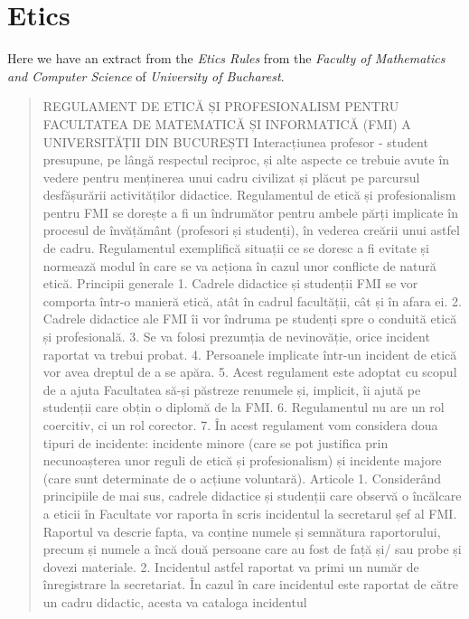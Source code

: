 \documentclass[paper=a4, fontsize=11pt]{scrartcl} %
\numberwithin{equation}{section} %
\numberwithin{figure}{section} %
\numberwithin{table}{section} %
\begin{document}
\section{Etics}



Here we have an extract from the \textit{Etics Rules} from the \textit{Faculty of Mathematics and Computer Science} of \textit{University of Bucharest}. \cite{Etica}

\begin{quote}

REGULAMENT DE ETICĂ ȘI PROFESIONALISM
PENTRU FACULTATEA DE MATEMATICĂ ȘI INFORMATICĂ (FMI)
A UNIVERSITĂȚII DIN BUCUREȘTI
Interacțiunea profesor - student presupune, pe lângă respectul reciproc, și alte aspecte
ce trebuie avute în vedere pentru menținerea unui cadru civilizat și plăcut pe parcursul
desfășurării activităților didactice.
Regulamentul de etică și profesionalism pentru FMI se dorește a fi un îndrumător pentru
ambele părți implicate în procesul de învățământ (profesori și studenți), în vederea
creării unui astfel de cadru. Regulamentul exemplifică situații ce se doresc a fi evitate și
normează modul în care se va acționa în cazul unor conflicte de natură etică.
Principii generale
1. Cadrele didactice și studenții FMI se vor comporta într-o manieră etică, atât în cadrul
facultății, cât și în afara ei.
2. Cadrele didactice ale FMI îi vor îndruma pe studenți spre o conduită etică și
profesională.
3. Se va folosi prezumția de nevinovăție, orice incident raportat va trebui probat.
4. Persoanele implicate într-un incident de etică vor avea dreptul de a se apăra.
5. Acest regulament este adoptat cu scopul de a ajuta Facultatea să-și păstreze
renumele și, implicit, îi ajută pe studenții care obțin o diplomă de la FMI.
6. Regulamentul nu are un rol coercitiv, ci un rol corector.
7. În acest regulament vom considera doua tipuri de incidente: incidente minore (care
se pot justifica prin necunoașterea unor reguli de etică și profesionalism) și incidente
majore (care sunt determinate de o acțiune voluntară).
Articole
1. Considerând principiile de mai sus, cadrele didactice și studenții care observă o
încălcare a eticii în Facultate vor raporta în scris incidentul la secretarul șef al FMI.
Raportul va descrie fapta, va conține numele și semnătura raportorului, precum și
numele a încă două persoane care au fost de față și/ sau probe și dovezi materiale.
2. Incidentul astfel raportat va primi un număr de înregistrare la secretariat. În cazul în
care incidentul este raportat de către un cadru didactic, acesta va cataloga incidentul

\end{quote}
\end{document}
